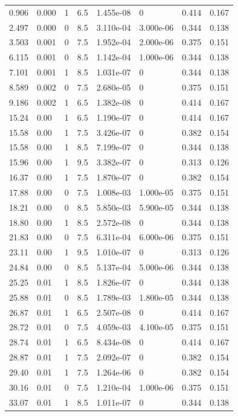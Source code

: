 \documentclass[preview]{standalone}
\begin{document}
{{\begin{tabular}{L{1.2cm}C{1.2cm} C{0.3cm}C{0.5cm} C{1.4cm}C{1.4cm} C{1.4cm}C{1.4cm}}
  0.906  &  0.000  & 1     & 6.5 &  1.455e-08  & 0  & 0.414 &  0.167   \\ 
  2.497  &  0.000  & 0     & 8.5 &  3.110e-04  & 3.000e-06  & 0.344 &  0.138   \\ 
  3.503  &  0.001  & 0     & 7.5 &  1.952e-04  & 2.000e-06  & 0.375 &  0.151   \\ 
  6.115  &  0.001  & 0     & 8.5 &  1.142e-04  & 1.000e-06  & 0.344 &  0.138   \\ 
  7.101  &  0.001  & 1     & 8.5 &  1.031e-07  & 0  & 0.344 &  0.138   \\ 
  8.589  &  0.002  & 0     & 7.5 &  2.680e-05  & 0  & 0.375 &  0.151   \\ 
  9.186  &  0.002  & 1     & 6.5 &  1.382e-08  & 0  & 0.414 &  0.167   \\ 
  15.24  &  0.00  & 1     & 6.5 &  1.190e-07  & 0  & 0.414 &  0.167   \\ 
  15.58  &  0.00  & 1     & 7.5 &  3.426e-07  & 0  & 0.382 &  0.154   \\ 
  15.58  &  0.00  & 1     & 8.5 &  7.199e-07  & 0  & 0.344 &  0.138   \\ 
  15.96  &  0.00  & 1     & 9.5 &  3.382e-07  & 0  & 0.313 &  0.126   \\ 
  16.37  &  0.00  & 1     & 7.5 &  1.870e-07  & 0  & 0.382 &  0.154   \\ 
  17.88  &  0.00  & 0     & 7.5 &  1.008e-03  & 1.000e-05  & 0.375 &  0.151   \\ 
  18.21  &  0.00  & 0     & 8.5 &  5.850e-03  & 5.900e-05  & 0.344 &  0.138   \\ 
  18.80  &  0.00  & 1     & 8.5 &  2.572e-08  & 0  & 0.344 &  0.138   \\ 
  21.83  &  0.00  & 0     & 7.5 &  6.311e-04  & 6.000e-06  & 0.375 &  0.151   \\ 
  23.11  &  0.00  & 1     & 9.5 &  1.010e-07  & 0  & 0.313 &  0.126   \\ 
  24.84  &  0.00  & 0     & 8.5 &  5.137e-04  & 5.000e-06  & 0.344 &  0.138   \\ 
  25.25  &  0.01  & 1     & 8.5 &  1.826e-07  & 0  & 0.344 &  0.138   \\ 
  25.88  &  0.01  & 0     & 8.5 &  1.789e-03  & 1.800e-05  & 0.344 &  0.138   \\ 
  26.87  &  0.01  & 1     & 6.5 &  2.507e-08  & 0  & 0.414 &  0.167   \\ 
  28.72  &  0.01  & 0     & 7.5 &  4.059e-03  & 4.100e-05  & 0.375 &  0.151   \\ 
  28.74  &  0.01  & 1     & 6.5 &  8.434e-08  & 0  & 0.414 &  0.167   \\ 
  28.87  &  0.01  & 1     & 7.5 &  2.092e-07  & 0  & 0.382 &  0.154   \\ 
  29.40  &  0.01  & 1     & 7.5 &  1.264e-06  & 0  & 0.382 &  0.154   \\ 
  30.16  &  0.01  & 0     & 7.5 &  1.210e-04  & 1.000e-06  & 0.375 &  0.151   \\ 
  33.07  &  0.01  & 1     & 8.5 &  1.011e-07  & 0  & 0.344 &  0.138   \\ 
\hline 
\end{tabular} 

}}
\end{document}
